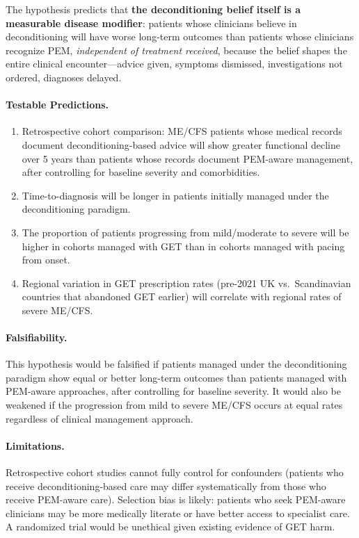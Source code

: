 \begin{hypothesis}
The hypothesis predicts that \textbf{the deconditioning belief itself is a measurable disease modifier}: patients whose clinicians believe in deconditioning will have worse long-term outcomes than patients whose clinicians recognize PEM, \emph{independent of treatment received}, because the belief shapes the entire clinical encounter---advice given, symptoms dismissed, investigations not ordered, diagnoses delayed.

\paragraph{Testable Predictions.}
\begin{enumerate}
    \item Retrospective cohort comparison: ME/CFS patients whose medical records document deconditioning-based advice will show greater functional decline over 5 years than patients whose records document PEM-aware management, after controlling for baseline severity and comorbidities.
    \item Time-to-diagnosis will be longer in patients initially managed under the deconditioning paradigm.
    \item The proportion of patients progressing from mild/moderate to severe will be higher in cohorts managed with GET than in cohorts managed with pacing from onset.
    \item Regional variation in GET prescription rates (pre-2021 UK vs.\ Scandinavian countries that abandoned GET earlier) will correlate with regional rates of severe ME/CFS.
\end{enumerate}

\paragraph{Falsifiability.}
This hypothesis would be falsified if patients managed under the deconditioning paradigm show equal or better long-term outcomes than patients managed with PEM-aware approaches, after controlling for baseline severity. It would also be weakened if the progression from mild to severe ME/CFS occurs at equal rates regardless of clinical management approach.

\paragraph{Limitations.}
Retrospective cohort studies cannot fully control for confounders (patients who receive deconditioning-based care may differ systematically from those who receive PEM-aware care). Selection bias is likely: patients who seek PEM-aware clinicians may be more medically literate or have better access to specialist care. A randomized trial would be unethical given existing evidence of GET harm.
\end{hypothesis}

